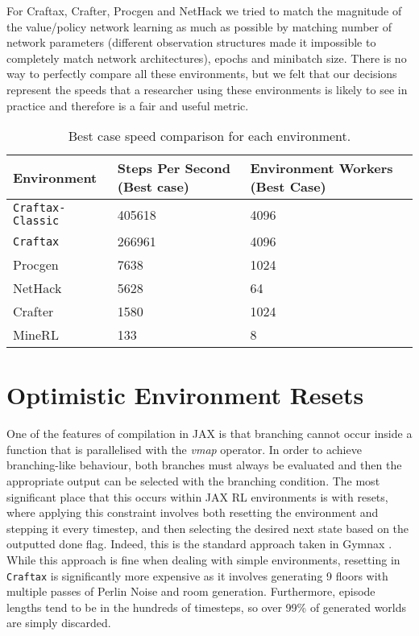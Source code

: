 \documentclass{article}
\theoremstyle{plain}
\theoremstyle{definition}
\theoremstyle{remark}
\begin{document}
For Craftax, Crafter, Procgen and NetHack we tried to match the magnitude of the value/policy network learning as much as possible by matching number of network parameters (different observation structures made it impossible to completely match network architectures), epochs and minibatch size.  There is no way to perfectly compare all these environments, but we felt that our decisions represent the speeds that a researcher using these environments is likely to see in practice and therefore is a fair and useful metric.

\begin{table*}[t]
\centering
\begin{tabular}{@{}l l l@{}} 
    \toprule
    \textbf{Environment} & \textbf{Steps Per Second (Best case)} & \textbf{Environment Workers (Best Case)} \\
    \midrule
    \texttt{Craftax-Classic} & 405618 & 4096 \\
    \texttt{Craftax} & 266961 & 4096 \\
    Procgen & 7638 & 1024 \\
    NetHack & 5628 & 64 \\
    Crafter & 1580 & 1024 \\
    MineRL & 133 & 8 \\
    \bottomrule
\end{tabular}
\caption{Best case speed comparison for each environment.}
\label{tab:speed_comparison}
\end{table*}

\section{Optimistic Environment Resets} \label{app:env_resets}

One of the features of compilation in JAX is that branching cannot occur inside a function that is parallelised with the \textit{vmap} operator.  In order to achieve branching-like behaviour, both branches must always be evaluated and then the appropriate output can be selected with the branching condition.  The most significant place that this occurs within JAX RL environments is with resets, where applying this constraint involves both resetting the environment and stepping it every timestep, and then selecting the desired next state based on the outputted done flag.  Indeed, this is the standard approach taken in Gymnax \citep{gymnax2022github}.  While this approach is fine when dealing with simple environments, resetting in \texttt{Craftax} is significantly more expensive as it involves generating 9 floors with multiple passes of Perlin Noise and room generation.  Furthermore, episode lengths tend to be in the hundreds of timesteps, so over 99\% of generated worlds are simply discarded.
\end{document}
